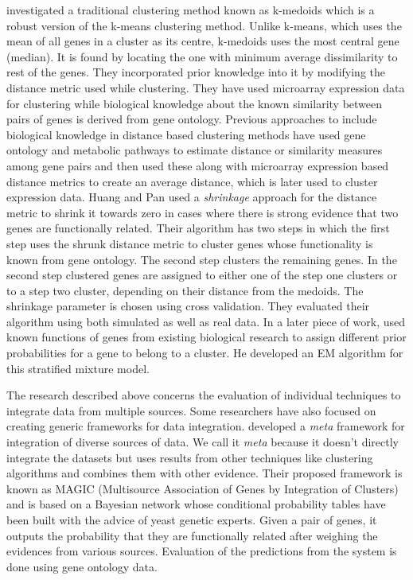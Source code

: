 \citet{huang2006incorporating} investigated a traditional clustering method known as k-medoids which is a robust version of the k-means clustering method. Unlike k-means, which uses the mean of all genes in a cluster as its centre, k-medoids uses the most central gene (median). It is found by locating the one with minimum average dissimilarity to rest of the genes. They incorporated prior knowledge into it by modifying the distance metric used while clustering. They have used microarray expression data for clustering while biological knowledge about the known similarity between pairs of genes is derived from gene ontology. Previous approaches to include biological knowledge in distance based clustering methods have used gene ontology and metabolic pathways to estimate distance or similarity measures among gene pairs and then used these along with microarray expression based distance metrics to create an average distance, which is later used to cluster expression data. Huang and Pan used a \textit{shrinkage} approach for the distance metric to shrink it towards zero in cases where there is strong evidence that two genes are functionally related. Their algorithm has two steps in which the first step uses the shrunk distance metric to cluster genes whose functionality is known from gene ontology. The second step clusters the remaining genes. In the second step clustered genes are assigned to either one of the step one clusters or to a step two cluster, depending on their distance from the medoids. The shrinkage parameter is chosen using cross validation. They evaluated their algorithm using both simulated as well as real data. In a later piece of work, \citet{pan06incorporating} used known functions of genes from existing biological research to assign different prior probabilities for a gene to belong to a cluster. He developed an \ac{EM} algorithm for this stratified mixture model. 

The research described above concerns the evaluation of individual techniques to integrate data from multiple sources. Some researchers have also focused on creating generic frameworks for data integration. \citet{Troyanskaya2003Bayesian} developed a \textit{meta} framework for integration of diverse sources of data. We call it \textit{meta} because it doesn't directly integrate the datasets but uses results from other techniques like clustering algorithms and combines them with other evidence. Their proposed framework is known as MAGIC (Multisource Association of Genes by Integration of Clusters) and is based on a Bayesian network whose conditional probability tables have been built with the advice of yeast genetic experts. Given a pair of genes, it outputs the probability that they are functionally related after weighing the evidences from various sources. Evaluation of the predictions from the system is done using gene ontology data. 

